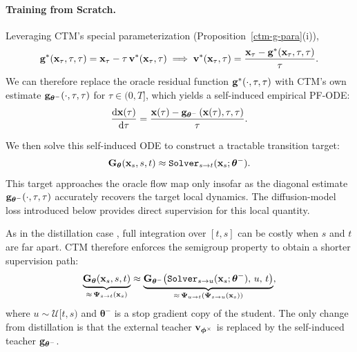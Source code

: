 \paragraph{Training from Scratch.}
Leveraging CTM's special parameterization (Proposition~\ref{ctm-g-para}(i)), 
\[
{\mathbf{g}}^*({\mathbf{x}}_\tau, \tau, \tau)
= {\mathbf{x}}_\tau - \tau\,{\mathbf{v}}^*({\mathbf{x}}_\tau,\tau)
 \implies 
{\mathbf{v}}^*({\mathbf{x}}_\tau,\tau)
= \frac{{\mathbf{x}}_\tau - {\mathbf{g}}^*({\mathbf{x}}_\tau, \tau, \tau)}{\tau}.
\]
We can therefore replace the oracle residual function
${\mathbf{g}}^*(\cdot,\tau,\tau)$ with CTM's own estimate
${\mathbf{g}}_{\bm{\theta}^-}(\cdot,\tau,\tau)$ for $\tau \in (0,T]$,
which yields a self-induced empirical PF-ODE:
\begin{align}\label{eq:emp-pf-ode-ctm}
\frac{\mathop{}\!\mathrm{d} {\mathbf{x}}(\tau)}{\mathop{}\!\mathrm{d} \tau}
= \frac{{\mathbf{x}}(\tau) - {\mathbf{g}}_{\bm{\theta}^-} \left({\mathbf{x}}(\tau),\tau,\tau\right)}{\tau}.
\end{align}

We then solve this self-induced ODE to construct a tractable transition target:
\[
\mathbf{G}_{\bm{\theta}}({\mathbf{x}}_s, s, t)
\approx \mathtt{Solver}_{s\to t}({\mathbf{x}}_s;\bm{\theta}^-).
\]
This target approaches the oracle flow map only insofar as the diagonal estimate
${\mathbf{g}}_{\bm{\theta}^-}(\cdot,\tau,\tau)$ accurately recovers the target local
dynamics. The diffusion-model loss introduced below provides direct supervision
for this local quantity.

As in the distillation case , full integration over $[t,s]$ can be
costly when $s$ and $t$ are far apart. CTM therefore enforces the semigroup
property to obtain a shorter supervision path:
\[
\underbrace{\mathbf{G}_{\bm{\theta}}({\mathbf{x}}_s, s, t)}_{\approx\, {\bm{\Psi}}_{s\to t}({\mathbf{x}}_s)}
 \approx 
\underbrace{\mathbf{G}_{\bm{\theta}^-} \big(\mathtt{Solver}_{s\to u}({\mathbf{x}}_s;\bm{\theta}^-),\, u,\, t\big)}_{\approx\, {\bm{\Psi}}_{u\to t}({\bm{\Psi}}_{s\to u}({\mathbf{x}}_s))},
\]
where $u \sim \mathcal{U}[t,s)$ and $\bm{\theta}^-$ is a stop gradient copy of
the student. The only change from distillation is that the external teacher
${\mathbf{v}}_{\bm{\phi}^\times}$ is replaced by the self-induced teacher
${\mathbf{g}}_{\bm{\theta}^-}$.

